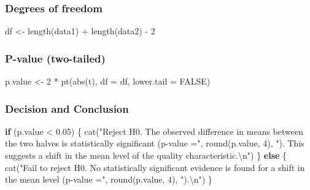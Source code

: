 \documentclass[
]{article}
\newenvironment{Shaded}{\begin{snugshade}}{\end{snugshade}}
\newcommand{\AttributeTok}[1]{\textcolor[rgb]{0.77,0.63,0.00}{#1}}
\newcommand{\ConstantTok}[1]{\textcolor[rgb]{0.00,0.00,0.00}{#1}}
\newcommand{\ControlFlowTok}[1]{\textcolor[rgb]{0.13,0.29,0.53}{\textbf{#1}}}
\newcommand{\DecValTok}[1]{\textcolor[rgb]{0.00,0.00,0.81}{#1}}
\newcommand{\FloatTok}[1]{\textcolor[rgb]{0.00,0.00,0.81}{#1}}
\newcommand{\FunctionTok}[1]{\textcolor[rgb]{0.00,0.00,0.00}{#1}}
\newcommand{\NormalTok}[1]{#1}
\newcommand{\OtherTok}[1]{\textcolor[rgb]{0.56,0.35,0.01}{#1}}
\newcommand{\SpecialCharTok}[1]{\textcolor[rgb]{0.00,0.00,0.00}{#1}}
\newcommand{\StringTok}[1]{\textcolor[rgb]{0.31,0.60,0.02}{#1}}
\begin{document}
\hypertarget{degrees-of-freedom}{%
\subsubsection{Degrees of freedom}\label{degrees-of-freedom}}

\begin{Shaded}
\begin{Highlighting}[]
\NormalTok{df }\OtherTok{\textless{}{-}} \FunctionTok{length}\NormalTok{(data1) }\SpecialCharTok{+} \FunctionTok{length}\NormalTok{(data2) }\SpecialCharTok{{-}} \DecValTok{2}
\end{Highlighting}
\end{Shaded}

\hypertarget{p-value-two-tailed}{%
\subsubsection{P-value (two-tailed)}\label{p-value-two-tailed}}

\begin{Shaded}
\begin{Highlighting}[]
\NormalTok{p.value }\OtherTok{\textless{}{-}} \DecValTok{2} \SpecialCharTok{*} \FunctionTok{pt}\NormalTok{(}\FunctionTok{abs}\NormalTok{(t), }\AttributeTok{df =}\NormalTok{ df, }\AttributeTok{lower.tail =} \ConstantTok{FALSE}\NormalTok{)}
\end{Highlighting}
\end{Shaded}

\hypertarget{decision-and-conclusion-2}{%
\subsubsection{Decision and
Conclusion}\label{decision-and-conclusion-2}}

\begin{Shaded}
\begin{Highlighting}[]
\ControlFlowTok{if}\NormalTok{ (p.value }\SpecialCharTok{\textless{}} \FloatTok{0.05}\NormalTok{) \{}
  \FunctionTok{cat}\NormalTok{(}\StringTok{"Reject H0. The observed difference in means between the two halves is statistically significant (p{-}value ="}\NormalTok{, }\FunctionTok{round}\NormalTok{(p.value, }\DecValTok{4}\NormalTok{), }\StringTok{"). This suggests a shift in the mean level of the quality characteristic.}\SpecialCharTok{\textbackslash{}n}\StringTok{"}\NormalTok{)}
\NormalTok{\} }\ControlFlowTok{else}\NormalTok{ \{}
  \FunctionTok{cat}\NormalTok{(}\StringTok{"Fail to reject H0. No statistically significant evidence is found for a shift in the mean level (p{-}value ="}\NormalTok{, }\FunctionTok{round}\NormalTok{(p.value, }\DecValTok{4}\NormalTok{), }\StringTok{").}\SpecialCharTok{\textbackslash{}n}\StringTok{"}\NormalTok{)}
\NormalTok{\}}
\end{Highlighting}
\end{Shaded}
\end{document}
